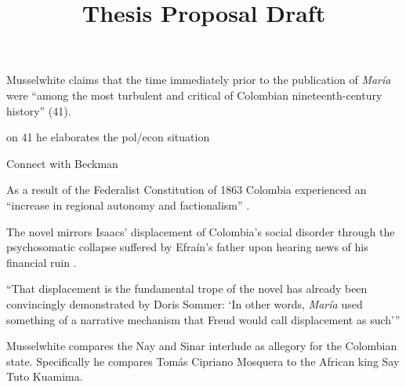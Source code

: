 \documentclass[12pt]{article}
\title{Thesis Proposal Draft}
\makeatletter
\newcommand\iraggedright{%
	\let\\\@centercr\@rightskip\@flushglue \rightskip\@rightskip
	\leftskip\z@skip}
\makeatother
\begin{document}
	\makeheader
	\iraggedright

Musselwhite claims that the time immediately prior to the publication of \textit{María} were \enquote{among the most turbulent and critical of Colombian nineteenth-century history} (41). 

on 41 he elaborates the pol/econ situation

Connect with Beckman

As a result of the Federalist Constitution of 1863 Colombia experienced an \enquote{increase in regional autonomy and factionalism} \cite[42]{Musselwhite2006}.

The novel mirrors Isaacs' displacement of Colombia's social disorder through the psychosomatic collapse suffered by Efraín's father upon hearing news of his financial ruin \cite[46]{Musselwhite2006}.

\enquote{That displacement is the fundamental trope of the novel has already been convincingly demonstrated by Doris Sommer: \enquote{In other words, \textit{María} used something of a narrative mechanism that Freud would call displacement as such}} \cite[46]{Musselwhite2006}

Musselwhite compares the Nay and Sinar interlude as allegory for the Colombian state. Specifically he compares Tomás Cipriano Mosquera to the African king Say Tuto Kuamima.
\end{document}
